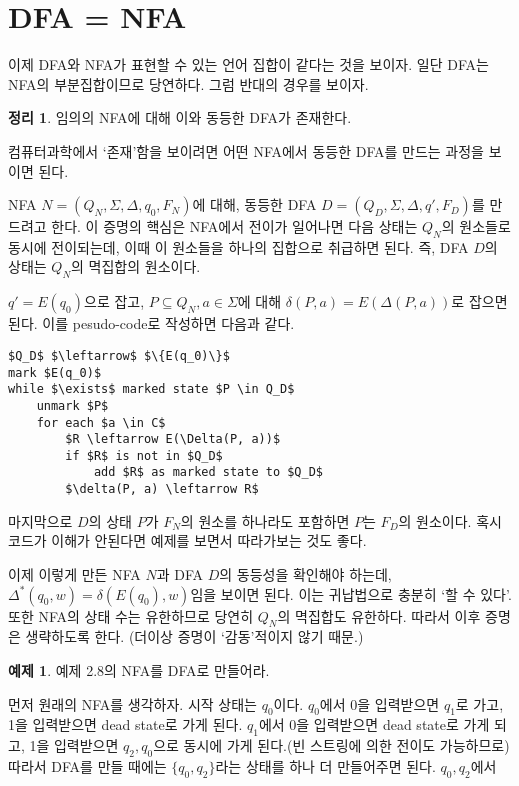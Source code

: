 \documentclass[b5paper, 10pt]{book}
\theoremstyle{definition}
\newtheorem{thm}[defn]{정리}
\newtheorem{ex}[defn]{예제}
\newenvironment{pf*}{\pushQED{\qed}\pf}{\popQED\endpf}
\begin{document}
\section{DFA = NFA}
이제 DFA와 NFA가 표현할 수 있는 언어 집합이 같다는 것을 보이자.
일단 DFA는 NFA의 부분집합이므로 당연하다. 그럼 반대의 경우를 보이자.
\begin{thm} \label{dfa nfa equiv}
    임의의 NFA에 대해 이와 동등한 DFA가 존재한다.
\end{thm}
\begin{pf*}
    컴퓨터과학에서 `존재'함을 보이려면 어떤 NFA에서 동등한 DFA를 만드는 
과정을 보이면 된다. 

NFA $N = (Q_N, \Sigma, \Delta, q_0, F_N)$에 대해, 동등한 DFA $D = (
    Q_D, \Sigma, \Delta, q', F_D
)$를 만드려고 한다. 이 증명의 핵심은 NFA에서 전이가 일어나면 다음 상태는 $Q_N$의
원소들로 동시에 전이되는데, 이때 이 원소들을 하나의 집합으로 취급하면 된다. 
즉, DFA $D$의 상태는 $Q_N$의 멱집합의 원소이다. 

$q' = E(q_0)$으로 잡고, $P \subseteq Q_N, a \in \Sigma$에 대해 $\delta(P, a) = E(
    \Delta(P, a)
)$로 잡으면 된다. 이를 pesudo-code로 작성하면 다음과 같다.
\begin{lstlisting}
$Q_D$ $\leftarrow$ $\{E(q_0)\}$
mark $E(q_0)$
while $\exists$ marked state $P \in Q_D$
    unmark $P$
    for each $a \in C$
        $R \leftarrow E(\Delta(P, a))$
        if $R$ is not in $Q_D$
            add $R$ as marked state to $Q_D$ 
        $\delta(P, a) \leftarrow R$
\end{lstlisting}
마지막으로 $D$의 상태 $P$가 $F_N$의 원소를 하나라도 포함하면 $P$는 $F_D$의 원소이다. 
혹시 코드가 이해가 안된다면 예제를 보면서 따라가보는 것도 좋다.

이제 이렇게 만든 NFA $N$과 DFA $D$의 동등성을 확인해야 하는데, 
$\Delta^*(q_0, w) = \delta(E(q_0), w)$임을 보이면 된다.
이는 귀납법으로 충분히 `할 수 있다'.
또한 NFA의 상태 수는 유한하므로 당연히 $Q_N$의 멱집합도 유한하다. 
따라서 이후 증명은 생략하도록 한다. (더이상 증명이 `감동'적이지 않기 때문.)
\end{pf*}
\begin{ex}예제 2.8의 NFA를 DFA로 만들어라. 
\end{ex} 
먼저 원래의 NFA를 생각하자. 시작 상태는 $q_0$이다. $q_0$에서 0을 입력받으면 $q_1$로 가고, 1을 입력받으면
dead state로 가게 된다. $q_1$에서 0을 입력받으면 dead state로 가게 되고, 1을 
입력받으면 $q_2, q_0$으로 동시에 가게 된다.(빈 스트링에 의한 전이도 가능하므로) 따라서
DFA를 만들 때에는 $\{q_0, q_2\}$라는 상태를 하나 더 만들어주면 된다. ${q_0, q_2}$에서
\end{document}
